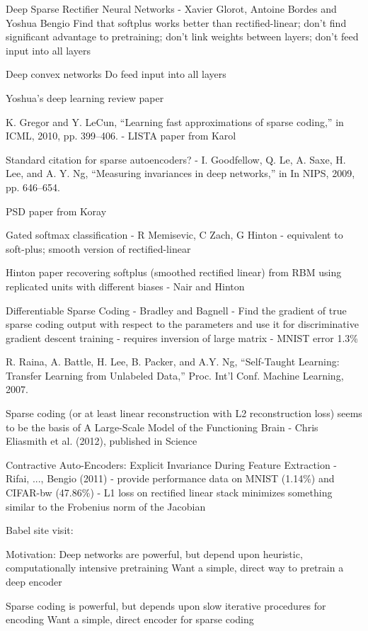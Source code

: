 Deep Sparse Rectifier Neural Networks - Xavier Glorot, Antoine Bordes and Yoshua Bengio
Find that softplus works better than rectified-linear; don't find significant advantage to pretraining; don't link weights between layers; don't feed input into all layers

Deep convex networks
Do feed input into all layers

Yoshua's deep learning review paper

K. Gregor and Y. LeCun, “Learning fast approximations of sparse coding,” in ICML, 2010, pp. 399–406. - LISTA paper from Karol

Standard citation for sparse autoencoders? - I. Goodfellow, Q. Le, A. Saxe, H. Lee, and A. Y. Ng, “Measuring invariances in deep networks,” in In NIPS, 2009, pp. 646–654.

PSD paper from Koray

Gated softmax classification - R Memisevic, C Zach, G Hinton - equivalent to soft-plus; smooth version of rectified-linear

Hinton paper recovering softplus (smoothed rectified linear) from RBM using replicated units with different biases - Nair and Hinton

Differentiable Sparse Coding - Bradley and Bagnell - Find the gradient of true sparse coding output with respect to the parameters and use it for discriminative gradient descent training - requires inversion of large matrix - MNIST error 1.3\%


R. Raina, A. Battle, H. Lee, B. Packer, and A.Y. Ng, “Self-Taught Learning: Transfer Learning from Unlabeled Data,” Proc. Int’l Conf. Machine Learning, 2007.

Sparse coding (or at least linear reconstruction with L2 reconstruction loss) seems to be the basis of A Large-Scale Model of the Functioning Brain - Chris Eliasmith et al. (2012), published in Science


Contractive Auto-Encoders: Explicit Invariance During Feature Extraction - Rifai, ..., Bengio (2011) - provide performance data on MNIST (1.14\%) and CIFAR-bw (47.86\%) - L1 loss on rectified linear stack minimizes something similar to the Frobenius norm of the Jacobian



Babel site visit:

Motivation:
Deep networks are powerful, but depend upon heuristic, computationally intensive pretraining
Want a simple, direct way to pretrain a deep encoder

Sparse coding is powerful, but depends upon slow iterative procedures for encoding
Want a simple, direct encoder for sparse coding


